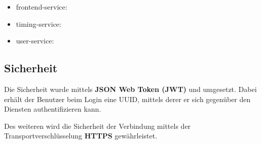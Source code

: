 \begin{itemize}
	\item frontend-service: 
	\item timing-service: 
	\item user-service:
\end{itemize}

\subsection{Sicherheit}

Die Sicherheit wurde mittels \textbf{JSON Web Token (JWT)} und umgesetzt. Dabei erhält der Benutzer beim Login eine UUID, mittels derer er sich gegenüber den Diensten authentifizieren kann. 

Des weiteren wird die Sicherheit der Verbindung mittels der Transportverschlüsselung \textbf{HTTPS} gewährleistet. 

